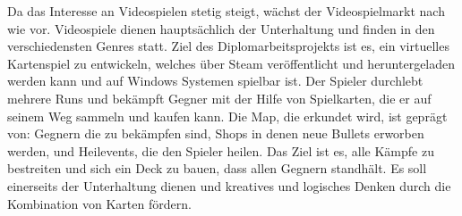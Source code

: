 %
Da das Interesse an Videospielen stetig steigt, wächst der Videospielmarkt nach wie vor. Videospiele dienen hauptsächlich der Unterhaltung  und finden in den verschiedensten Genres statt.
Ziel des Diplomarbeitsprojekts ist es, ein virtuelles Kartenspiel zu entwickeln, welches über Steam veröffentlicht und heruntergeladen werden kann und auf Windows Systemen spielbar ist. Der Spieler durchlebt mehrere Runs und bekämpft Gegner mit der Hilfe von Spielkarten, die er auf seinem Weg sammeln und kaufen kann. Die Map, die erkundet wird, ist geprägt von: Gegnern die zu bekämpfen sind, Shops in denen neue Bullets erworben werden, und Heilevents, die den Spieler heilen. Das Ziel ist es, alle Kämpfe zu bestreiten und sich ein Deck zu bauen, dass allen Gegnern standhält.
Es soll einerseits der Unterhaltung dienen und kreatives und logisches Denken durch die Kombination von Karten fördern.
%

